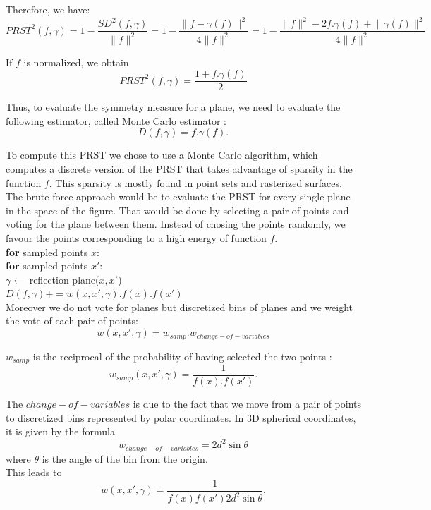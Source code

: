 \documentclass[10pt,a4paper]{article}			%
\begin{document}
Therefore, we have:
$$ PRST^2(f,\gamma) = 1 - \frac{SD^2(f,\gamma)}{\lVert f \lVert ^2} =  1 - \frac{\lVert f - \gamma(f) \lVert ^2 }{4 \lVert f \lVert ^2}	=  1 - \frac{\lVert f \lVert ^2 - 2f.\gamma(f) + \lVert \gamma(f) \lVert ^2 }{4 \lVert f \lVert ^2} $$

If $f$ is normalized, we obtain
$$ PRST^2(f,\gamma) = \frac{1 + f.\gamma(f)}{2} $$

	Thus, to evaluate the symmetry measure for a plane, we need to evaluate the following estimator, called Monte Carlo estimator :
$$ D(f,\gamma) = f.\gamma(f). $$
	
	To compute this PRST we chose to use a Monte Carlo algorithm, which computes a discrete version of the PRST that takes advantage of sparsity in the function $f$. This sparsity is mostly found in  point sets and rasterized surfaces.
	The brute force approach would be to evaluate the PRST for every single plane in the space of the figure. That would be done by selecting a pair of points and voting for the plane between them. Instead of chosing the points randomly, we favour the points corresponding to a high energy of function $f$.\\
	

\indent \indent \textbf{for} sampled points $x$:\\
\indent \indent \indent \textbf{for} sampled points $x'$: \\
\indent \indent \indent \indent $\gamma \leftarrow$ reflection plane($x, x'$)\\
\indent \indent \indent \indent $D(f,\gamma) += w(x, x',\gamma).f(x).f(x')$\\
	
Moreover we do not vote for planes but discretized bins of planes and we weight the vote of each pair of points:
$$ w(x, x',\gamma) = w_{samp} . w_{change-of-variables} $$

$w_{samp}$ is the reciprocal of the probability of having selected the two points :
$$w_{samp}(x, x',\gamma) = \frac{1}{f(x).f(x')}. $$

The $change-of-variables$ is due to the fact that we move from a pair of points to discretized bins represented by polar coordinates. In 3D spherical coordinates, it is given by the formula \[w_{change-of-variables} = 2d^2\sin\theta\]
where $\theta$ is the angle of the bin from the origin.\\

This leads to $$ w(x, x',\gamma) = \frac{1}{f(x)f(x')2d^2\sin\theta}. $$
\end{document}

